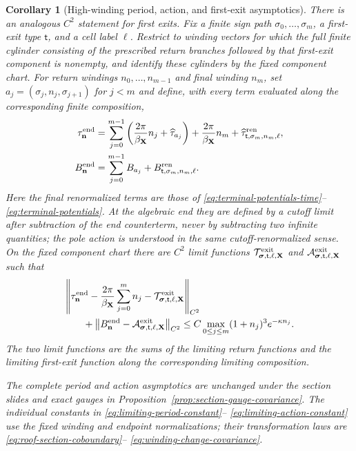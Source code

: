 \documentclass[11pt]{amsart}
\numberwithin{equation}{section}
\newtheorem{corollary}[theorem]{Corollary}
\theoremstyle{definition}
\theoremstyle{remark}
\begin{document}
\begin{corollary}[High-winding period, action, and first-exit asymptotics]
There is an analogous $C^2$ statement for first exits.  Fix a finite sign
path $\sigma_0,\ldots,\sigma_m$, a first-exit type $\mathsf t$, and a cell
label $\ell$.  Restrict to winding vectors for which the full finite
cylinder consisting of the prescribed return branches followed by that
first-exit component is nonempty, and identify these cylinders by the fixed
component chart.  For return windings $n_0,\ldots,n_{m-1}$ and final
winding $n_m$, set $a_j=(\sigma_j,n_j,\sigma_{j+1})$ for $j<m$ and define,
with every term evaluated along the corresponding finite composition,
\begin{align*}
 \tau_{\mathbf n}^{\rm end}
 &=\sum_{j=0}^{m-1}\left(
     \frac{2\pi}{\beta_{\mathbf X}}n_j+\widehat\tau_{a_j}\right)
   +\frac{2\pi}{\beta_{\mathbf X}}n_m
   +\widehat\tau^{\mathrm{ren}}_{\mathsf t,\sigma_m,n_m,\ell},\\
 B_{\mathbf n}^{\rm end}
 &=\sum_{j=0}^{m-1}B_{a_j}
   +B^{\mathrm{ren}}_{\mathsf t,\sigma_m,n_m,\ell}.
\end{align*}
Here the final renormalized terms are those of
\eqref{eq:terminal-potentials-time}--\eqref{eq:terminal-potentials}.  At the
algebraic end they are defined by a cutoff limit after subtraction of the
end counterterm, never by subtracting two infinite quantities; the pole
action is understood in the same cutoff-renormalized sense.  On the fixed
component chart there are
$C^2$ limit functions
$\mathcal T^{\rm exit}_{\boldsymbol\sigma,\mathsf t,\ell,\mathbf X}$ and
$\mathcal A^{\rm exit}_{\boldsymbol\sigma,\mathsf t,\ell,\mathbf X}$ such
that
\begin{align}
 &\left\|\tau_{\mathbf n}^{\rm end}
   -\frac{2\pi}{\beta_{\mathbf X}}\sum_{j=0}^{m}n_j
   -\mathcal T^{\rm exit}_{\boldsymbol\sigma,\mathsf t,\ell,\mathbf X}
   \right\|_{C^2}\notag\\
 &\qquad+
 \left\|B_{\mathbf n}^{\rm end}
   -\mathcal A^{\rm exit}_{\boldsymbol\sigma,\mathsf t,\ell,\mathbf X}
   \right\|_{C^2}
 \le C\max_{0\le j\le m}(1+n_j)^3e^{-\kappa n_j}.
 \label{eq:first-exit-time-action-asymptotic}
\end{align}
The two limit functions are the sums of the limiting return functions and
the limiting first-exit function along the corresponding limiting
composition.

The complete period and action asymptotics are unchanged under the section
slides and exact gauges in
Proposition~\ref{prop:section-gauge-covariance}.  The individual constants
in \eqref{eq:limiting-period-constant}--
\eqref{eq:limiting-action-constant} use the fixed winding and endpoint
normalizations; their transformation laws are
\eqref{eq:roof-section-coboundary}--
\eqref{eq:winding-change-covariance}.
\end{corollary}
\end{document}
